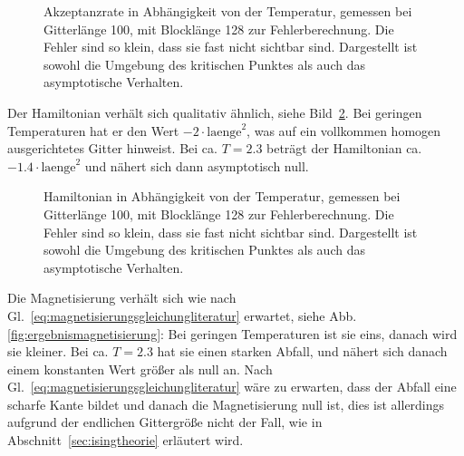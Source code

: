 	
	\begin{figure}[htbp]
		
		\caption[Akzeptanzrate in Abhängigkeit von der Temperatur]{Akzeptanzrate in Abhängigkeit von der Temperatur, gemessen bei Gitterlänge 100, mit Blocklänge 128 zur Fehlerberechnung. Die Fehler sind so klein, dass sie fast nicht sichtbar sind. Dargestellt ist sowohl die Umgebung des kritischen Punktes als auch das asymptotische Verhalten.}
		\label{fig:ergebnisakzeptanzrate}
	\end{figure}
	
	Der Hamiltonian verhält sich qualitativ ähnlich, siehe Bild~\ref{fig:ergebnishamiltonian}. Bei geringen Temperaturen hat er den Wert $-2\cdot\text{laenge}^2$, was auf ein vollkommen homogen ausgerichtetes Gitter hinweist. Bei ca.{} $T=\num{2,3}$ beträgt der Hamiltonian ca.{} $-\num{1,4}\cdot\text{laenge}^2$ und nähert sich dann asymptotisch null.
	
	
	
	
	\begin{figure}[htbp]
		
		\caption[Hamiltonian in Abhängigkeit von der Temperatur]{Hamiltonian in Abhängigkeit von der Temperatur, gemessen bei Gitterlänge 100, mit Blocklänge 128 zur Fehlerberechnung. Die Fehler sind so klein, dass sie fast nicht sichtbar sind. Dargestellt ist sowohl die Umgebung des kritischen Punktes als auch das asymptotische Verhalten.}
		\label{fig:ergebnishamiltonian}
	\end{figure}
	

	Die Magnetisierung verhält sich wie nach Gl.~\ref{eq:magnetisierungsgleichungliteratur} erwartet, siehe Abb. \ref{fig:ergebnismagnetisierung}: Bei geringen Temperaturen ist sie eins, danach wird sie kleiner. Bei ca. $T=\num{2,3}$ hat sie einen starken Abfall, und nähert sich danach einem konstanten Wert größer als null an. Nach Gl.~\ref{eq:magnetisierungsgleichungliteratur} wäre zu erwarten, dass der Abfall eine scharfe Kante bildet und danach die Magnetisierung null ist, dies ist allerdings aufgrund der endlichen Gittergröße nicht der Fall, wie in Abschnitt~\ref{sec:isingtheorie} erläutert wird.
	
